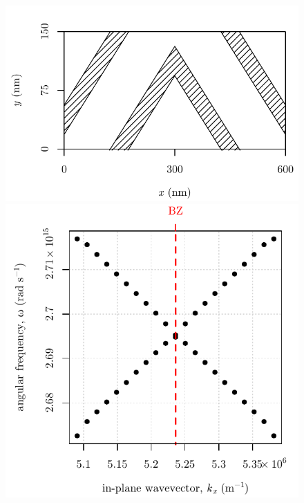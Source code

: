 \begin{figure}
\begin{center}
{	\begin{minipage}{0.3\linewidth}
		\includegraphics[width=\textwidth]{./hfss-bandgaps/figure-symmetric-highamp-unitcell}\\
		\includegraphics[width=\textwidth]{./hfss-bandgaps/figure-symmetric-highamp-bandgaps}
	\end{minipage}
}
\end{center}
\end{figure}
